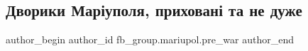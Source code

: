  
 
 
 
 

\subsection{Дворики Маріуполя, приховані та не дуже}
\label{sec:11_02_2023.fb.fb_group.mariupol.pre_war.10.dvoriki_mar_upolya__}

\ifcmt
 author_begin
   author_id fb_group.mariupol.pre_war
 author_end
\fi
